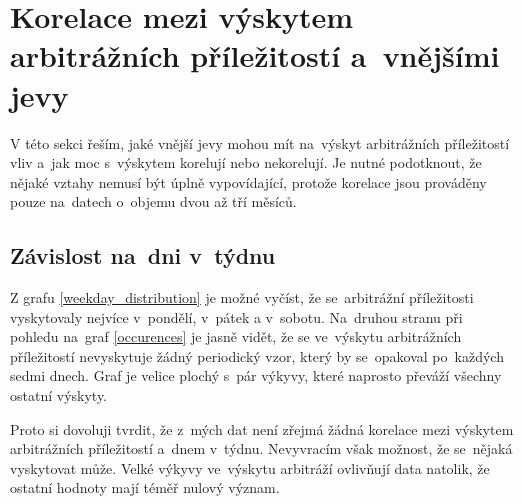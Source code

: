 \documentclass[thesis=B,czech]{FITthesis}[2019/03/21]
\begin{document}
\section{Korelace mezi výskytem arbitrážních příležitostí a~vnějšími jevy}
V této sekci řeším, jaké vnější jevy mohou mít na~výskyt arbitrážních příležitostí vliv a~jak moc s~výskytem korelují nebo nekorelují. Je nutné podotknout, že nějaké vztahy nemusí být úplně vypovídající, protože korelace jsou prováděny pouze na~datech o~objemu dvou až tří měsíců.

\subsection{Závislost na~dni v~týdnu}
Z grafu \ref{weekday_distribution} je možné vyčíst, že se~arbitrážní příležitosti vyskytovaly nejvíce v~pondělí, v~pátek a v~sobotu. Na~druhou stranu při pohledu na~graf \ref{occurences} je jasně vidět, že se ve~výskytu arbitrážních příležitostí nevyskytuje žádný periodický vzor, který by se~opakoval po~každých sedmi dnech. Graf je velice plochý s~pár výkyvy, které naprosto převáží všechny ostatní výskyty.

Proto si dovoluji tvrdit, že z~mých dat není zřejmá žádná korelace mezi výskytem arbitrážních příležitostí a~dnem v~týdnu. Nevyvracím však možnost, že se~nějaká vyskytovat může. Velké výkyvy ve~výskytu arbitráží ovlivňují data natolik, že ostatní hodnoty mají téměř nulový význam.
\end{document}
